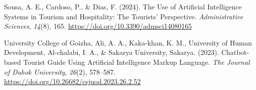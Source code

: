 \begin{list}{}{\setlength{\leftmargin}{1.2cm}\setlength{\itemindent}{-1.2cm}\setlength{\itemsep}{8pt}}
\item Sousa, A. E., Cardoso, P., \& Dias, F. (2024). The Use of Artificial Intelligence Systems in Tourism and Hospitality: The Tourists' Perspective. \textit{Administrative Sciences}, \textit{14}(8), 165. \url{https://doi.org/10.3390/admsci14080165}

\item University College of Goizha, Ali, A. A., Kaka-khan, K. M., University of Human Development, Al-chalabi, I. A., \& Sakarya University, Sakarya. (2023). Chatbot-based Tourist Guide Using Artificial Intelligence Markup Language. \textit{The Journal of Duhok University}, \textit{26}(2), 578--587. \url{https://doi.org/10.26682/csjuod.2023.26.2.52}

\end{list}
